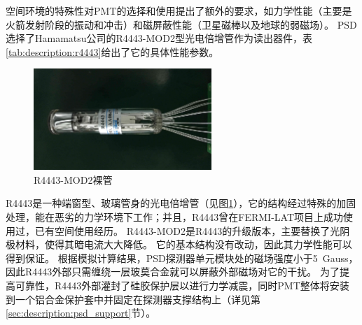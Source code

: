 空间环境的特殊性对PMT的选择和使用提出了额外的要求，如力学性能（主要是火箭发射阶段的振动和冲击）和磁屏蔽性能（卫星磁棒以及地球的弱磁场）。
PSD选择了Hamamatsu公司的R4443-MOD2型光电倍增管作为读出器件，表\ref{tab:description:r4443}给出了它的具体性能参数。
\begin{figure}[htb]
\centering
\includegraphics[width=0.6\textwidth]{chap/description/fig/r4443.jpg}
\caption{R4443-MOD2裸管}
\label{fig:description:r4443}
\end{figure}
R4443是一种端窗型、玻璃管身的光电倍增管（见图\ref{fig:description:r4443}），它的结构经过特殊的加固处理，能在恶劣的力学环境下工作；并且，R4443曾在FERMI-LAT项目上成功使用过，已有空间使用经历。
R4443-MOD2是R4443的升级版本，主要替换了光阴极材料，使得其暗电流大大降低。
它的基本结构没有改动，因此其力学性能可以得到保证。
根据模拟计算结果\parencite{psd_tdr}，PSD探测器单元模块处的磁场强度小于\SI{5}{Gauss}，因此R4443外部只需缠绕一层玻莫合金就可以屏蔽外部磁场对它的干扰。
为了提高可靠性，R4443外部灌封了硅胶保护层以进行力学减震，同时PMT整体将安装到一个铝合金保护套中并固定在探测器支撑结构上（详见第\ref{sec:description:psd_support}节）。
